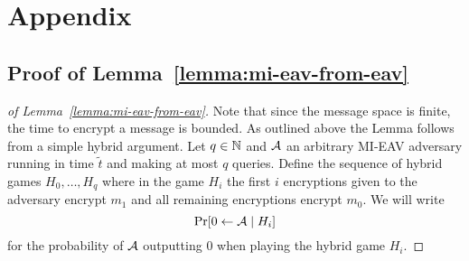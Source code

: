 \chapter{Appendix}

\section{Proof of Lemma~\ref{lemma:mi-eav-from-eav}} \label{sec:mi-eav-from-eav-proof}

\begin{proof}[of Lemma~\ref{lemma:mi-eav-from-eav}] Note that since the message space is finite, the time to encrypt a message is bounded. As outlined above the Lemma follows from a simple hybrid argument. Let $q \in \mathbb{N}$ and $\mathcal{A}$ an arbitrary MI-EAV adversary running in time $\tilde{t}$ and making at most $q$ queries. Define the sequence of hybrid games $H_0, \ldots, H_q$ where in the game $H_i$ the first $i$ encryptions given to the adversary encrypt $m_1$ and all remaining encryptions encrypt $m_0$. We will write
	\[
		\pr{0 \from \adv \mid H_i}
	\]
	for the probability of $\mathcal{A}$ outputting $0$ when playing the hybrid game $H_i$.


\end{proof}
